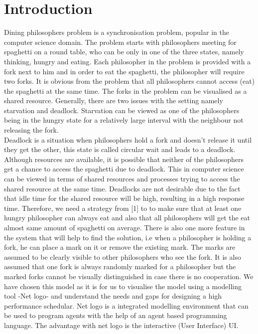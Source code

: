 \section{Introduction}

Dining philosophers problem is a synchronisation problem, popular in the computer science domain. The problem starts with philosophers meeting for spaghetti on a round table, who can be only in one of the three states, namely thinking, hungry and eating. Each philosopher in the problem is provided with a fork next to him and in order to eat the spaghetti, the philosopher will require two forks. It is obvious from the problem that all philosophers cannot access (eat) the spaghetti at the same time. The forks in the problem can be visualised as a shared resource. Generally, there are two issues with the setting namely starvation and deadlock. Starvation can be viewed as one of the philosophers being in the hungry state for a relatively large interval with the neighbour not releasing the fork. 
\\Deadlock is a situation when philosophers hold a fork and doesn’t release it until they get the other, this state is called circular wait and leads to a deadlock. Although resources are available, it is possible that neither of the philosophers get a chance to access the spaghetti due to deadlock. This in computer science can be viewed in terms of shared resources and processes trying to access the shared resource at the same time. Deadlocks are not desirable due to the fact that idle time for the shared resource will be high, resulting in  a high response time. Therefore, we need a strategy from [1] to to make sure that at least one hungry philosopher can always eat and also that all philosophers will get the eat almost same amount of spaghetti on average. There is also one more feature in the system that will help to find the solution, i.e when a philosopher is holding a fork, he can place a mark on it or remove the existing mark. The marks are assumed to be clearly visible to other philosophers who see the fork. It is also assumed that one fork is always randomly marked for a philosopher but the marked forks cannot be visually distinguished in case there is no cooperation. We have chosen this model as it is for us to visualise the model using a modelling tool -Net logo- and understand the needs and gaps for designing a high performance schedular. Net logo is a integrated modelling environment  that can be used to program agents with the help of an agent based programming language. The advantage with net logo is the interactive (User Interface) UI.         


